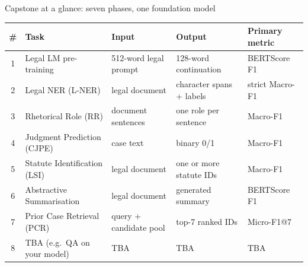 \documentclass[aspectratio=169,11pt]{beamer}
\begin{document}
\begin{frame}{Capstone at a glance: seven phases, one foundation model}
  \small
  \begin{tabularx}{\textwidth}{@{}clXXl@{}}
    \toprule
    \# & Task & Input & Output & Primary metric\\
    \midrule
    1 & Legal LM pre-training & 512-word legal prompt & 128-word continuation & BERTScore F1\\
    2 & Legal NER (L-NER) & legal document & character spans + labels & strict Macro-F1\\
    3 & Rhetorical Role (RR) & document sentences & one role per sentence & Macro-F1\\
    4 & Judgment Prediction (CJPE) & case text & binary 0/1 & Macro-F1\\
    5 & Statute Identification (LSI) & legal document & one or more statute IDs & Macro-F1\\
    6 & Abstractive Summarisation & legal document & generated summary & BERTScore F1\\
    7 & Prior Case Retrieval (PCR) & query + candidate pool & top-7 ranked IDs & Micro-F1@7\\
    8 & TBA (e.g.\ QA on your model) & TBA & TBA & TBA\\
    \bottomrule
  \end{tabularx}
  \vspace{2mm}
  \begin{center}
  \end{center}
\end{frame}
\end{document}

